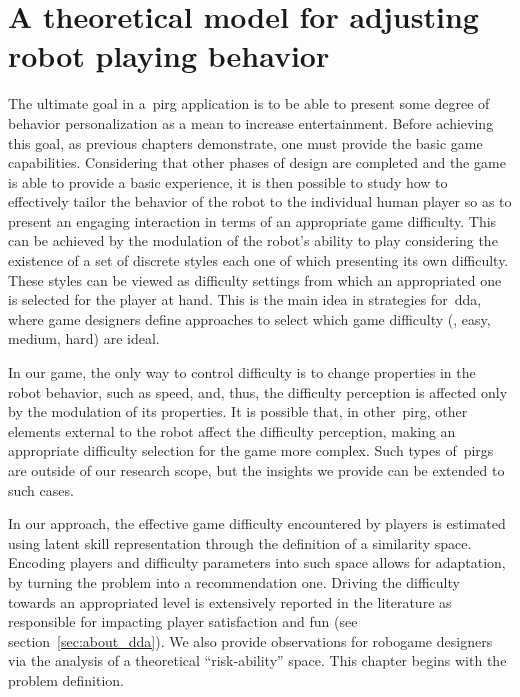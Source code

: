 \chapter{A theoretical model for adjusting robot playing behavior}\label{ch:adaptation}

The ultimate goal in a~\gls{pirg} application is to be able to present some degree of behavior personalization as a mean to increase entertainment. Before achieving this goal, as previous chapters demonstrate, one must provide the basic game capabilities. Considering that other phases of design are completed and the game is able to provide a basic experience, it is then possible to study how to effectively tailor the behavior of the robot to the individual human player so as to present an engaging interaction in terms of an appropriate game difficulty. This can be achieved by the modulation of the robot's ability to play considering the existence of a set of discrete styles each one of which presenting its own difficulty. These styles can be viewed as difficulty settings from which an appropriated one is selected for the player at hand. This is the main idea in strategies for~\glsdesc{dda}, where game designers define approaches to select which game difficulty (\eg, easy, medium, hard) are ideal. 

In our game, the only way to control difficulty is to change properties in the robot behavior, such as speed, and, thus, the difficulty perception is affected only by the modulation of its properties. It is possible that, in other~\gls{pirg}, other elements external to the robot affect the difficulty perception, making an appropriate difficulty selection for the game more complex. Such types of~\gls{pirg}s are outside of our research scope, but the insights we provide can be extended to such cases. 

In our approach, the effective game difficulty encountered by players is estimated using latent skill representation through the definition of a similarity space. Encoding players and difficulty parameters into such space allows for adaptation, by turning the problem into a recommendation one. Driving the difficulty towards an appropriated level is extensively reported in the literature as responsible for impacting player satisfaction and fun (see section~\ref{sec:about_dda}).
We also provide observations for robogame designers via the analysis of a theoretical ``risk-ability'' space. This chapter begins with the problem definition.

